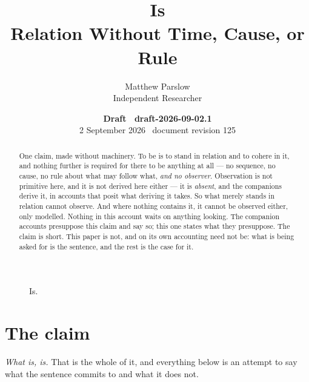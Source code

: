 \documentclass[11pt,a4paper]{article}
\title{Is\\\large Relation Without Time, Cause, or Rule}
\author{Matthew Parslow\\Independent Researcher}
\date{\textbf{Draft \texorpdfstring{\textemdash}{---}\ draft-2026-09-02.1}\\[2pt]2 September 2026 \texorpdfstring{\textbullet}{\textperiodcentered}\ document revision 125}
\begin{document}
\maketitle
\begin{center}
\end{center}
\vspace{1em}

\begin{figure}[!ht]
\centering
{}
\caption{Is.}
\label{fig:is}
\end{figure}

\begin{abstract}
One claim, made without machinery. To be is to stand in relation and to cohere in it, and nothing
further is required for there to be anything at all --- no sequence, no cause, no rule about what may
follow what, \emph{and no observer}. Observation is not primitive here, and it is not derived
here either --- it is \emph{absent}, and the companions derive it, in accounts that
posit what deriving it takes. So what merely stands in relation cannot observe. And where nothing contains it, it cannot be
observed either, only modelled. Nothing in this account waits on anything looking. The
companion accounts presuppose this claim and say so; this one states what they presuppose. The claim is short. This paper is not, and on its own accounting need not
be: what is being asked for is the sentence, and the rest is the case for it.
\end{abstract}

\section{The claim}\label{sec:claim}
\emph{What is, is.} That is the whole of it, and everything below is an attempt to say what the sentence
commits to and what it does not.
\end{document}
